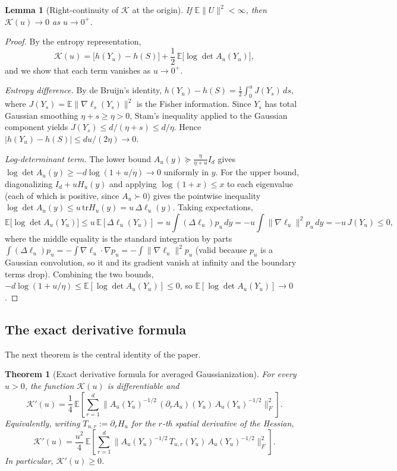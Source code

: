 \documentclass[11pt]{article}
\def\E{\mathbb{E}}
\newcommand{\norm}[1]{\|#1\|}
\newcommand{\tr}{\mathrm{tr}}
\newtheorem{lemma}{Lemma}
\newtheorem{thm}{Theorem}
\begin{document}
\begin{lemma}[Right-continuity of \(\mathcal K\) at the origin]
\label{lem:K_continuity_at_zero}
If \(\E\norm{U}^2<\infty\), then \(\mathcal K(u)\to 0\) as \(u\to 0^+\).
\end{lemma}

\begin{proof}
By the entropy representation,
\[
\mathcal K(u)
=
\big[h(Y_u)-h(S)\big]
+
\frac12\,\E\big[\log\det A_u(Y_u)\big],
\]
and we show that each term vanishes as \(u\to 0^+\).

\emph{Entropy difference.} By de Bruijn's identity,
\(h(Y_u)-h(S)=\tfrac12\int_0^u J(Y_s)\,ds\), where \(J(Y_s)=\E\norm{\nabla\ell_s(Y_s)}^2\) is the Fisher information. Since \(Y_s\) has total Gaussian smoothing \(\eta+s\ge\eta>0\), Stam's inequality applied to the Gaussian component yields \(J(Y_s)\le d/(\eta+s)\le d/\eta\). Hence \(|h(Y_u)-h(S)|\le du/(2\eta)\to 0\).

\emph{Log-determinant term.} The lower bound \(A_u(y)\succeq \tfrac{\eta}{\eta+u}I_d\) gives
\(\log\det A_u(y)\ge -d\log(1+u/\eta)\to 0\) uniformly in \(y\). For the upper bound, diagonalizing \(I_d+uH_u(y)\) and applying \(\log(1+x)\le x\) to each eigenvalue (each of which is positive, since \(A_u\succ 0\)) gives the pointwise inequality \(\log\det A_u(y)\le u\,\tr H_u(y)=u\,\Delta\ell_u(y)\). Taking expectations,
\[
\E\big[\log\det A_u(Y_u)\big]\le u\,\E[\Delta\ell_u(Y_u)]=u\int(\Delta\ell_u)p_u\,dy=-u\int\norm{\nabla\ell_u}^2 p_u\,dy=-u\,J(Y_u)\le 0,
\]
where the middle equality is the standard integration by parts \(\int(\Delta\ell_u)p_u=-\int\nabla\ell_u\cdot\nabla p_u=-\int\norm{\nabla\ell_u}^2 p_u\) (valid because \(p_u\) is a Gaussian convolution, so it and its gradient vanish at infinity and the boundary terms drop). Combining the two bounds, \(-d\log(1+u/\eta)\le \E[\log\det A_u(Y_u)]\le 0\), so \(\E[\log\det A_u(Y_u)]\to 0\).
\end{proof}

\subsection{The exact derivative formula}

The next theorem is the central identity of the paper.

\begin{thm}[Exact derivative formula for averaged Gaussianization]
\label{thm:exact_derivative_formula}
For every \(u>0\), the function \(\mathcal K(u)\) is differentiable and
\begin{equation}
\label{eq:exact_derivative_formula}
\mathcal K'(u)
=
\frac14\,
\E\!\left[
\sum_{r=1}^d
\big\|A_u(Y_u)^{-1/2}\,(\partial_r A_u)(Y_u)\,A_u(Y_u)^{-1/2}\big\|_F^2
\right].
\end{equation}
Equivalently, writing \(T_{u,r}:=\partial_r H_u\) for the \(r\)-th spatial derivative of the Hessian,
\begin{equation}
\label{eq:exact_derivative_formula_T}
\mathcal K'(u)
=
\frac{u^2}{4}\,
\E\!\left[
\sum_{r=1}^d
\big\|A_u(Y_u)^{-1/2}\,T_{u,r}(Y_u)\,A_u(Y_u)^{-1/2}\big\|_F^2
\right].
\end{equation}
In particular, \(\mathcal K'(u)\ge 0\).
\end{thm}
\end{document}
